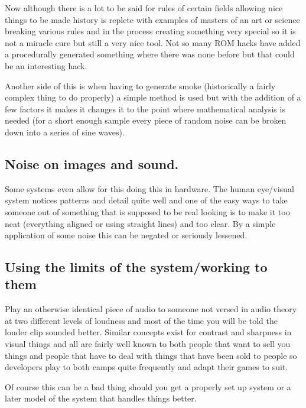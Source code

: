 \documentclass[
]{book}
\begin{document}
Now although there is a lot to be said for rules of certain fields allowing nice things to be made history is replete with examples of masters of an art or science breaking various rules and in the process creating something very special so it is not a miracle cure but still a very nice tool. Not so many ROM hacks have added a procedurally generated something where there was none before but that could be an interesting hack.

Another side of this is when having to generate smoke (historically a fairly complex thing to do properly) a simple method is used but with the addition of a few factors it makes it changes it to the point where mathematical analysis is needed (for a short enough sample every piece of random noise can be broken down into a series of sine waves).

\hypertarget{noise-on-images-and-sound.}{%
\subsection{Noise on images and sound.}\label{noise-on-images-and-sound.}}

Some systems even allow for this doing this in hardware. The human eye/visual system notices patterns and detail quite well and one of the easy ways to take someone out of something that is supposed to be real looking is to make it too neat (everything aligned or using straight lines) and too clear. By a simple application of some noise this can be negated or seriously lessened.

\hypertarget{using-the-limits-of-the-systemworking-to-them}{%
\subsection{Using the limits of the system/working to them}\label{using-the-limits-of-the-systemworking-to-them}}

Play an otherwise identical piece of audio to someone not versed in audio theory at two different levels of loudness and most of the time you will be told the louder clip sounded better. Similar concepts exist for contrast and sharpness in visual things and all are fairly well known to both people that want to sell you things and people that have to deal with things that have been sold to people so developers play to both camps quite frequently and adapt their games to suit.

Of course this can be a bad thing should you get a properly set up system or a later model of the system that handles things better.
\end{document}
